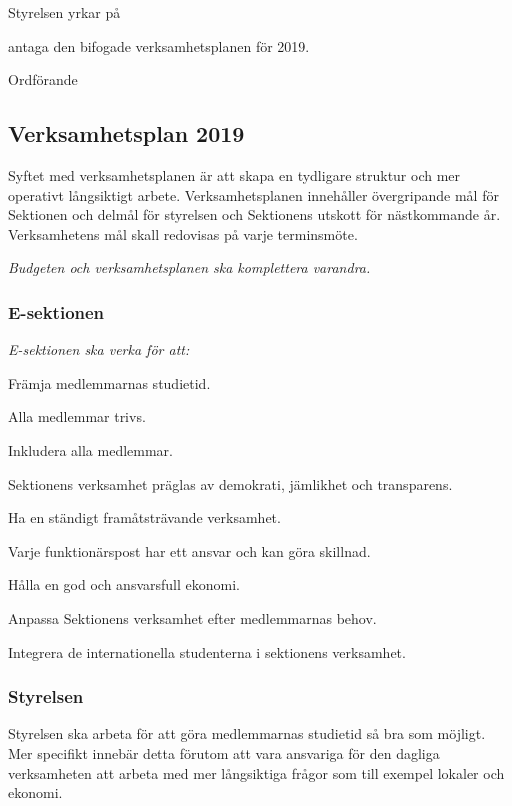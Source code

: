 \documentclass[../_main/handlingar.tex]{subfiles}
\begin{document}

Styrelsen yrkar på

\begin{attsatser}
    \att antaga den bifogade verksamhetsplanen för 2019.
\end{attsatser}

\begin{signatures}{1}
    \ist
    \signature{\ordf}{Ordförande}
\end{signatures}

\subsection*{Verksamhetsplan 2019}
Syftet med verksamhetsplanen är att skapa en tydligare struktur och mer operativt långsiktigt arbete. Verksamhetsplanen innehåller övergripande mål för Sektionen och delmål för styrelsen och Sektionens utskott för nästkommande år. Verksamhetens mål skall redovisas på varje terminsmöte.

\emph{Budgeten och verksamhetsplanen ska komplettera varandra.}

\subsubsection*{E-sektionen}
\emph{E-sektionen ska verka för att:}
\begin{dashlist}
    \item Främja medlemmarnas studietid. 
    \item Alla medlemmar trivs.
    \item Inkludera alla medlemmar. 
    \item Sektionens verksamhet präglas av demokrati, jämlikhet och transparens.
    \item Ha en ständigt framåtsträvande verksamhet. 
    \item Varje funktionärspost har ett ansvar och kan göra skillnad. 
    \item Hålla en god och ansvarsfull ekonomi. 
    \item Anpassa Sektionens verksamhet efter medlemmarnas behov.
    \item Integrera de internationella studenterna i sektionens verksamhet.
\end{dashlist}

\subsubsection*{Styrelsen}
Styrelsen ska arbeta för att göra medlemmarnas studietid så bra som möjligt. Mer specifikt innebär detta förutom att vara ansvariga för den dagliga verksamheten att arbeta med mer långsiktiga frågor som till exempel lokaler och ekonomi. 
\end{document}
